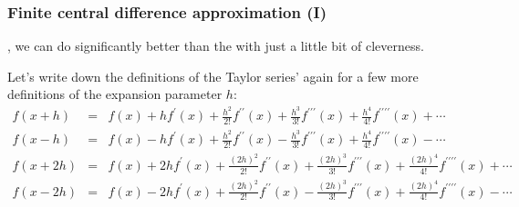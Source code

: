 \documentclass[hyperref={colorlinks=true}]{beamer}
\begin{document}

\begin{frame}%
  \frametitle{Finite central difference approximation (I)}  
  
  , we can do significantly better than the  with just a little bit of cleverness.
  
  \mysp
  
  Let's write down the definitions of the Taylor series' again for a few more definitions of the expansion parameter $h$:
  \begin{eqnarray}
    f(x+h) &=& f(x) + hf^{\prime}(x) + \frac{h^2}{2!}f^{\prime\prime}(x) + \frac{h^3}{3!}f^{\prime\prime\prime}(x)+\frac{h^4}{4!}f^{\prime\prime\prime\prime}(x) + \cdots \nonumber \\
    f(x-h) &=& f(x) - hf^{\prime}(x) + \frac{h^2}{2!}f^{\prime\prime}(x) - \frac{h^3}{3!}f^{\prime\prime\prime}(x)+\frac{h^4}{4!}f^{\prime\prime\prime\prime}(x) - \cdots \nonumber \\
    f(x+2h) &=& f(x) + 2hf^{\prime}(x) + \frac{(2h)^2}{2!}f^{\prime\prime}(x) + \frac{(2h)^3}{3!}f^{\prime\prime\prime}(x)+\frac{(2h)^4}{4!}f^{\prime\prime\prime\prime}(x) + \cdots \nonumber \\
    f(x-2h) &=& f(x) - 2hf^{\prime}(x) + \frac{(2h)^2}{2!}f^{\prime\prime}(x) - \frac{(2h)^3}{3!}f^{\prime\prime\prime}(x)+\frac{(2h)^4}{4!}f^{\prime\prime\prime\prime}(x) - \cdots \nonumber
  \end{eqnarray}

\end{frame}

\end{document}
